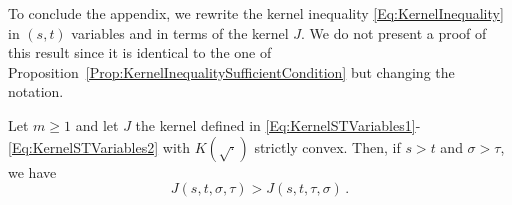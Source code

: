 To conclude the appendix, we rewrite the kernel inequality \eqref{Eq:KernelInequality} in $(s,t)$ variables and in terms of the kernel $J$. We do not present a proof of this result since it is identical to the one of Proposition~\ref{Prop:KernelInequalitySufficientCondition} but changing the notation.

\begin{lemma}
\label{Lemma:KernelInequalityCone} Let $m\geq 1$ and let $J$ the kernel defined in
\eqref{Eq:KernelSTVariables1}-\eqref{Eq:KernelSTVariables2} with $K(\sqrt{\cdot})$ strictly convex. Then, if $s>t$ and $\sigma > \tau$, we have
\begin{equation*}
J(s,t,\sigma, \tau) > J(s,t,\tau, \sigma)\,.
\end{equation*}
\end{lemma}

